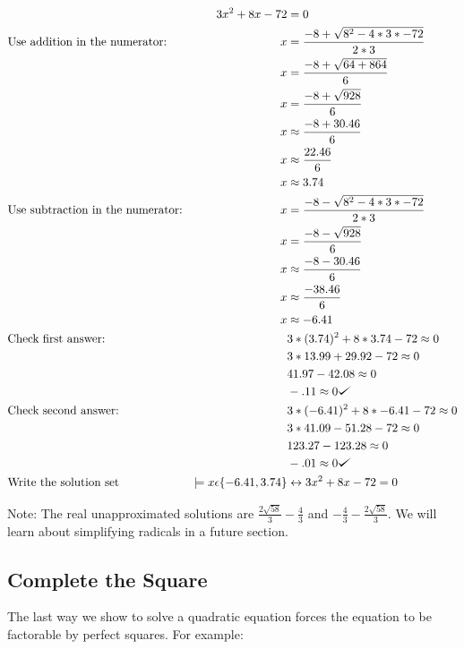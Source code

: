 \documentclass{book}
\theoremstyle{definition}
\def\checkmark{\tikz\fill[scale=0.4](0,.35) -- (.25,0) -- (1,.7) -- (.25,.15) -- cycle;}
\begin{document}
\begin{align*}\label{(6.11)}
&       &3x^2+8x-72&=0 \\
&\text{Use addition in the numerator:}  &x&= \frac{-8+\sqrt{8^2-4*3*-72}}{2*3} \\
&       &x&=\frac{-8+\sqrt{64+864}}{6}\\
&       &x&=\frac{-8+\sqrt{928}}{6}\\
&       &x&\approx \frac{-8+30.46}{6}\\
&       &x&\approx \frac{22.46}{6}\\
&       &x&\approx 3.74\\
&\text{Use subtraction in the numerator:}  &x&= \frac{-8-\sqrt{8^2-4*3*-72}}{2*3} \\
&       &x&=\frac{-8-\sqrt{928}}{6}\\
&       &x&\approx \frac{-8-30.46}{6}\\
&       &x&\approx \frac{-38.46}{6}\\
&       &x&\approx -6.41\\
&\text{Check first answer:}  &&3*(3.74)^2+8*3.74-72 \approx 0 \\
&       &&3*13.99+29.92-72 \approx0\\
&       &&41.97-42.08 \approx 0\\
&       &&-.11 \approx 0 \checkmark{} \\
&\text{Check second answer:}  &&3*(-6.41)^2+8*-6.41-72 \approx 0 \\
&       &&3*41.09-51.28-72 \approx0\\
&       &&123.27-123.28 \approx 0\\
&       &&-.01 \approx 0 \checkmark{} \\
&\text{Write the solution set}   &\models x\epsilon\{-6.41,3.74\} &\leftrightarrow 3x^2+8x-72=0
\end{align*}
				             
Note: The real unapproximated solutions are $\frac{2\sqrt{58}}{3}-\frac{4}{3}$ and $-\frac{4}{3}-\frac{2\sqrt{58}}{3}$. We will learn about simplifying radicals in a future section.

\subsection{Complete the Square}

The last way we show to solve a quadratic equation forces the equation to be factorable by perfect squares. For example:
\end{document}
